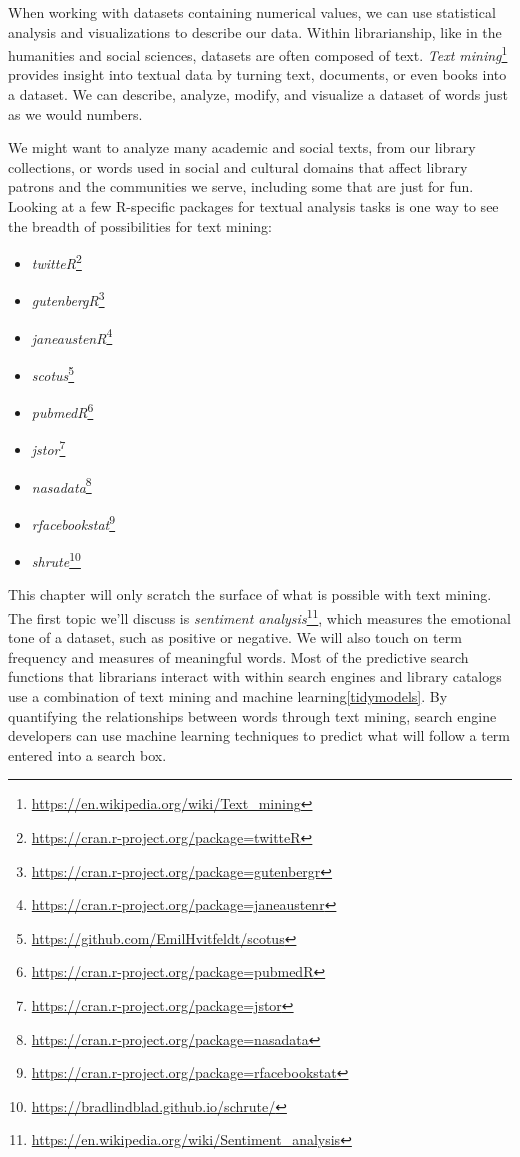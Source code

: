 \documentclass[
  krantz2]{krantz}
\providecommand{\tightlist}{%
  \setlength{\itemsep}{0pt}\setlength{\parskip}{0pt}}
\begin{document}
When working with datasets containing numerical values, we can use statistical analysis and visualizations to describe our data. Within librarianship, like in the humanities and social sciences, datasets are often composed of text. \emph{Text mining}\footnote{\url{https://en.wikipedia.org/wiki/Text_mining}} provides insight into textual data by turning text, documents, or even books into a dataset. We can describe, analyze, modify, and visualize a dataset of words just as we would numbers.

We might want to analyze many academic and social texts, from our library collections, or words used in social and cultural domains that affect library patrons and the communities we serve, including some that are just for fun. Looking at a few R-specific packages for textual analysis tasks is one way to see the breadth of possibilities for text mining:

\begin{itemize}
\tightlist
\item
  \emph{twitteR}\footnote{\url{https://cran.r-project.org/package=twitteR}}
\item
  \emph{gutenbergR}\footnote{\url{https://cran.r-project.org/package=gutenbergr}}
\item
  \emph{janeaustenR}\footnote{\url{https://cran.r-project.org/package=janeaustenr}}
\item
  \emph{scotus}\footnote{\url{https://github.com/EmilHvitfeldt/scotus}}
\item
  \emph{pubmedR}\footnote{\url{https://cran.r-project.org/package=pubmedR}}
\item
  \emph{jstor}\footnote{\url{https://cran.r-project.org/package=jstor}}
\item
  \emph{nasadata}\footnote{\url{https://cran.r-project.org/package=nasadata}}
\item
  \emph{rfacebookstat}\footnote{\url{https://cran.r-project.org/package=rfacebookstat}}
\item
  \emph{shrute}\footnote{\url{https://bradlindblad.github.io/schrute/}}
\end{itemize}

This chapter will only scratch the surface of what is possible with text mining. The first topic we'll discuss is \emph{sentiment analysis}\footnote{\url{https://en.wikipedia.org/wiki/Sentiment_analysis}}, which measures the emotional tone of a dataset, such as positive or negative. We will also touch on term frequency and measures of meaningful words. Most of the predictive search functions that librarians interact with within search engines and library catalogs use a combination of text mining and machine learning\ref{tidymodels}. By quantifying the relationships between words through text mining, search engine developers can use machine learning techniques to predict what will follow a term entered into a search box.
\end{document}
